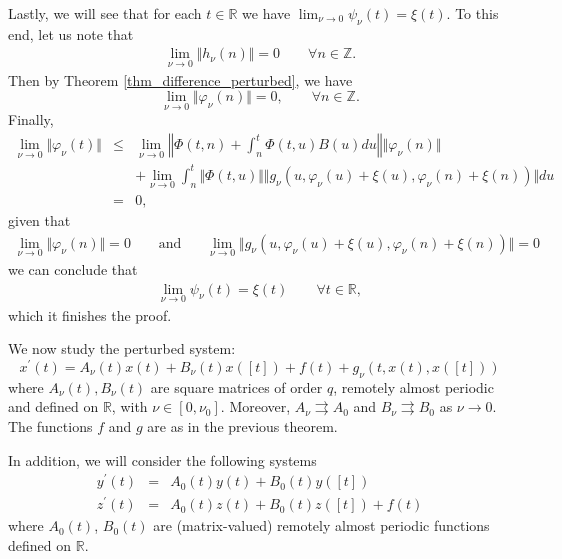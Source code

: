 \documentclass[english,,reqno]{amsart}
\numberwithin{equation}{section}
\theoremstyle{plain}
\theoremstyle{definition}
\theoremstyle{remark}
\begin{document}
Lastly, we will see that for each $t\in\mathbb{R}$ we have  $\lim_{\nu\rightarrow0}\psi_{\nu}\left(t\right)=\xi(t)$. To this end, let us note that
\begin{eqnarray*}
\lim_{\nu\rightarrow 0} \Vert h_\nu(n)\Vert =0 \quad\quad \forall n \in \mathbb{Z}.
\end{eqnarray*}
Then by Theorem \ref{thm_difference_perturbed}, we have 
$$\lim_{\nu\rightarrow 0}\Vert \varphi_{\nu}(n)\Vert=0, \quad\quad \forall n \in \mathbb{Z}.$$
Finally,
\begin{eqnarray*}
\lim_{\nu\rightarrow 0} \Vert \varphi_{\nu}(t) \Vert &\leq &\lim_{\nu\rightarrow 0} 
\left\Vert \Phi\left(t,n\right)+\int_{n}^{t}\Phi\left(t,u\right)B\left(u\right)du\right\Vert \Vert\varphi_{\nu}\left(n\right)\Vert\\
 &  & + \lim_{\nu\rightarrow 0} \int_{n}^{t}\Vert \Phi\left(t,u\right)\Vert \Vert g_{\nu}\left(u,\varphi_{\nu}\left(u\right)+\xi\left(u\right),\varphi_{\nu}\left(n\right)+\xi\left(n\right)\right)\Vert du\\
 &=& 0,
\end{eqnarray*}
given that
\begin{eqnarray*}
\lim_{\nu\rightarrow 0} \Vert\varphi_{\nu}\left(n\right)\Vert =0\ \ \ \quad\mbox{ and }\quad \ \ \lim_{\nu\rightarrow 0}\Vert g_{\nu}\left(u,\varphi_{\nu}\left(u\right)+\xi\left(u\right),\varphi_{\nu}\left(n\right)+\xi\left(n\right)\right)\Vert =0
\end{eqnarray*}
we can conclude that
\begin{eqnarray*}
\lim_{\nu\rightarrow 0} \psi_{\nu}(t)=\xi(t) \quad \quad \forall t\in\mathbb{R},
\end{eqnarray*}
which it finishes the proof.

We now study the perturbed system:
\begin{equation}
x^{\prime}(t) = A_{\nu}(t)x(t) + B_{\nu}(t)x([t]) + f(t) + g_{\nu}(t, x(t), x([t])) \label{eq:A_v(t)}
\end{equation}
where $A_{\nu}(t), B_{\nu}(t)$ are square matrices of order $q$,  
remotely almost periodic and defined on $\mathbb{R}$, with $\nu \in [0, \nu_0]$.  
Moreover, $A_{\nu} \rightrightarrows A_{0}$ and $B_{\nu} \rightrightarrows B_{0}$ as $\nu \to 0$.  
The functions $f$ and $g$ are as in the previous theorem.

In addition, we will consider the following systems
\begin{eqnarray}
y^{\prime}(t)&=&A_{0}\left(t\right)y(t)+B_{0}(t)y([t])\label{eq:A_0}\\
z^{\prime}(t)&=&A_{0}\left(t\right)z(t)+B_{0}(t)z([t])+f\left(t\right)\label{eq:A_0+f}
\end{eqnarray}
where $A_0(t)$, $B_0(t)$ are (matrix-valued) remotely almost periodic functions defined on $\mathbb{R}$.  
\end{document}
